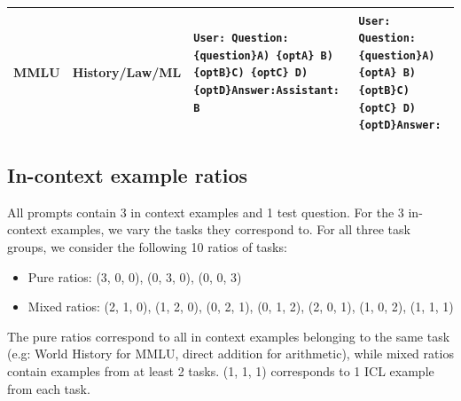 \documentclass[11pt]{article}
\begin{document}
\begin{table}[t]
\begin{tabular}{llp{}p{}}
\midrule
MMLU & History/Law/ML
  & \texttt{User: Question: \{question\}}\newline\texttt{A) \{optA\} B) \{optB\}}\newline\texttt{C) \{optC\} D) \{optD\}}\newline\texttt{Answer:}\newline\texttt{Assistant: B}
  & \texttt{User: Question: \{question\}}\newline\texttt{A) \{optA\} B) \{optB\}}\newline\texttt{C) \{optC\} D) \{optD\}}\newline\texttt{Answer:} \\
\bottomrule
\end{tabular}
\end{table}

\subsection{In-context example ratios}
\label{subsec:icl_ratios}
All prompts contain 3 in context examples and 1 test question. For the 3 in-context examples, we vary the tasks they correspond to. For all three task groups, we consider the following 10 ratios of tasks:
\begin{itemize}
    \item Pure ratios: (3, 0, 0), (0, 3, 0), (0, 0, 3)
    \item Mixed ratios: (2, 1, 0), (1, 2, 0), (0, 2, 1), (0, 1, 2), (2, 0, 1), (1, 0, 2), (1, 1, 1)
\end{itemize}
The pure ratios correspond to all in context examples belonging to the same task (e.g: World History for MMLU, direct addition for arithmetic), while mixed ratios contain examples from at least 2 tasks. (1, 1, 1) corresponds to 1 ICL example from each task.
\end{document}
